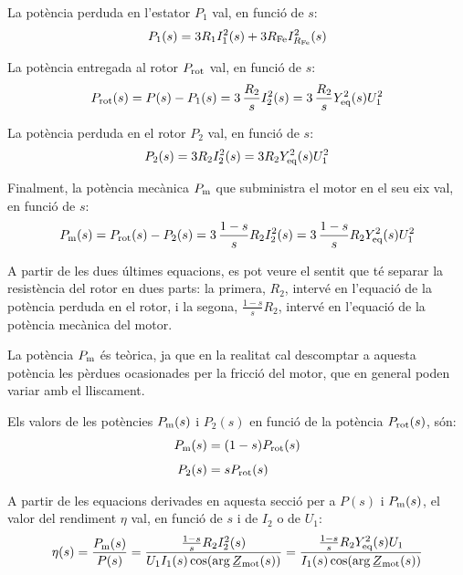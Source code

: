 La potència perduda en l'estator $P_1$ val, en funció de $s$:
\begin{equation}
    P_1(s)  =  3 R_1 I_1^2(s) + 3 R_\mathrm{Fe} I_{R_\mathrm{Fe}}^2(s)
\end{equation}

La potència entregada al rotor $P_\mathrm{rot}$  val, en funció de $s$:
\begin{equation}
    P_\mathrm{rot}(s)  =  P(s) - P_1(s) = 3 \,\frac{R_2}{s} I_2^2(s) = 3 \,\frac{R_2}{s} Y_\mathrm{eq}^2(s) U_1^2
\end{equation}

La potència perduda en el rotor $P_2$ val, en funció de $s$:
\begin{equation}
    P_2(s)  =  3 R_2 I_2^2(s) = 3 R_2 Y_\mathrm{eq}^2(s) U_1^2
\end{equation}

Finalment, la potència mecànica $P_\mathrm{m}$ que subministra el motor en el seu eix val, en funció de $s$:
\begin{equation}\index{motors d'inducció!potència mecànica}
    P\ped{m}(s)  =  P\ped{rot}(s) - P_2(s) = 3 \,\frac{1-s}{s} R_2 I_2^2(s) = 3 \,\frac{1-s}{s} R_2 Y\ped{eq}^2(s) U_1^2 \label{eq:Pm-I2-U1}
\end{equation}

A partir de les dues últimes equacions, es pot veure el sentit que té separar la resistència del rotor en dues parts: la primera, $R_2$,  intervé en l'equació de la potència perduda en el rotor, i la segona, $\frac{1-s}{s} R_2$,  intervé en l'equació de la potència mecànica del motor.

La potència $P_\mathrm{m}$  és teòrica, ja que en la realitat cal descomptar a aquesta potència les pèrdues ocasionades per la fricció del motor, que en general poden variar amb el lliscament.

Els valors de les potències $P_\mathrm{m}(s)$ i  $P_2(s)$ en funció de la  potència    $P_\mathrm{rot}(s)$, són:
\begin{subequations}
\begin{align}
    P_\mathrm{m}(s) &=  (1-s) P_\mathrm{rot}(s) \label{eq:Pm-Prot} \\[1ex]
    P_2(s) &=   s P_\mathrm{rot}(s)
\end{align}
\end{subequations}

A partir de les equacions derivades en aquesta secció per a $P(s)$ i $P_\mathrm{m}(s)$, el valor del rendiment $\eta$ val, en funció de $s$ i de $I_2$ o de $U_1$:
\begin{equation}\index{motors d'inducció!rendiment}
	\eta(s) = \frac{P\ped{m}(s)}{P(s)} = \frac{\frac{1-s}{s} R_2 I_2^2(s)}{U_1 I_1(s) \cos(\arg\cmplx{Z}\ped{mot}(s))} =  \frac{\frac{1-s}{s} R_2 Y\ped{eq}^2(s) U_1}{I_1(s) \cos(\arg\cmplx{Z}\ped{mot}(s))} \label{eq:mot-rendim}
\end{equation}

